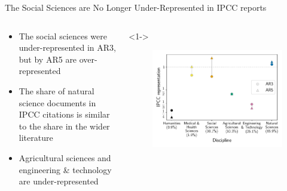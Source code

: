 \documentclass[9pt, aspectratio=169]{beamer}
\begin{document}
\begin{frame}{The Social Sciences are No Longer Under-Represented in IPCC reports}
\begin{columns}
	
	\begin{column}{0.382\linewidth}
		\begin{itemize}
			\item<1-> The social sciences were under-represented in AR3, but by AR5 are over-represented
			\item<2-> The share of natural science documents in IPCC citations is similar to the share in the wider literature
			\item<3-> Agricultural sciences and engineering \& technology are under-represented		
		\end{itemize}
	\end{column}
	
	\begin{column}{0.618\linewidth}<1->
		\begin{figure}[h!]
			\begin{center}
				\includegraphics[width=\linewidth]{../plots_pub/ipcc_rep_oecds_simplified_lp.pdf}
			\end{center}
		\end{figure}
	\end{column}
\end{columns}
\end{frame}
\end{document}
